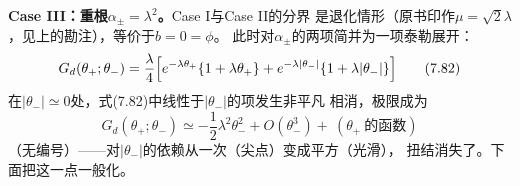 \textbf{Case III：重根$\alpha_{\pm}=\lambda^{2}$。}Case I与Case II的分界
是退化情形（原书印作$\mu=\sqrt{2}\lambda$，见上的勘注），等价于$b=0=\phi$。
此时对$\alpha_{\pm}$的两项简并为一项泰勒展开：
\begin{equation*}
G_{d}(\theta_{+};\theta_{-})=\frac{\lambda}{4}\Bigl[
e^{-\lambda\theta_{+}}\{1+\lambda\theta_{+}\}
+e^{-\lambda|\theta_{-}|}\{1+\lambda|\theta_{-}|\}\Bigr]
\tag{7.82}
\end{equation*}
在$|\theta_{-}|\simeq0$处，式(7.82)中线性于$|\theta_{-}|$的项发生非平凡
相消，极限成为
\begin{equation*}
G_{d}(\theta_{+};\theta_{-})\simeq-\frac{1}{2}\lambda^{2}\theta_{-}^{2}
+O(\theta_{-}^{3})+\ (\theta_{+}\ \text{的函数})
\end{equation*}
（无编号）——对$|\theta_{-}|$的依赖从一次（尖点）变成平方（光滑），
扭结消失了。下面把这一点一般化。

